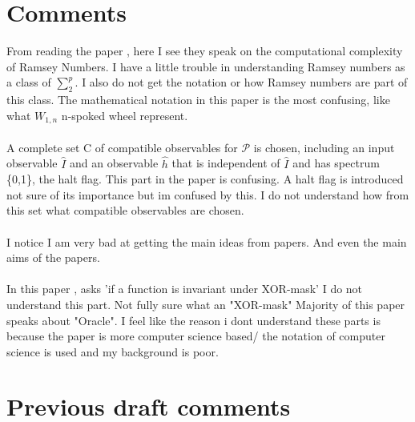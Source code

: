 \documentclass[15pt, a4paper]{Assignment}
\begin{document}
\section*{Comments}


From reading the paper \cite{burr1981generalized}, here I see they speak on the computational complexity of Ramsey Numbers. 
I have a little trouble in understanding Ramsey numbers as a class of $\sum_{2}^{p}$. 
I also do not get the notation or how Ramsey numbers are part of this class.
The mathematical notation in this paper is the most confusing, like what $W_{1,n}$ n-spoked wheel represent.
\\
\\
\cite{Deutsch1989}
A complete set C of compatible observables for $\mathcal{P}$ is chosen, including an input 
observable $\hat{I}$ and an observable $\hat{h}$ that is independent of $\hat{I}$ and has spectrum \{0,1\}, the halt flag. 
This part in the paper is confusing.
A halt flag is introduced not sure of its importance but im confused by this.
I do not understand how from this set what compatible observables are chosen.
\\
\\
I notice I am very bad at getting the main ideas from papers.
And even the main aims of the papers.
\\
\\
In this paper \cite{doi:10.1137/S0097539796298637}, asks 'if a function is invariant under XOR-mask' I do not understand this part.
Not fully sure what an "XOR-mask"
Majority of this paper speaks about "Oracle".
I feel like the reason i dont understand these parts is because the paper is more computer science based/ the notation of computer science is used and my background is poor. 
\section*{Previous draft comments}
\newpage

\end{document}
